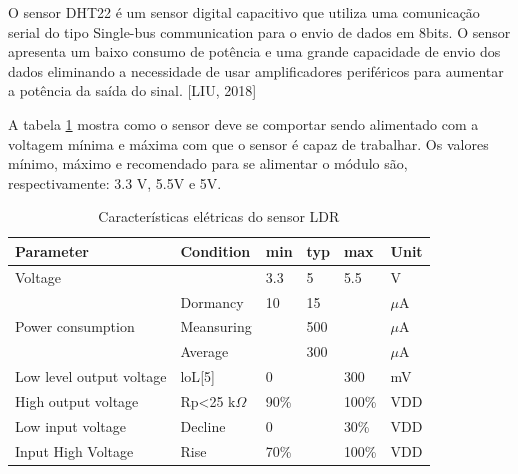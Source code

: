 O sensor DHT22 é um sensor digital capacitivo que utiliza uma comunicação serial do tipo Single-bus communication para o envio de dados em 8bits. O sensor apresenta um baixo consumo de potência e uma grande capacidade de envio dos dados eliminando a necessidade de usar amplificadores periféricos para aumentar a potência da saída do sinal. [LIU, 2018]

A tabela \ref{caracteristicas_eletricas} mostra como o sensor deve se comportar sendo alimentado com a voltagem mínima e máxima com que o sensor é capaz de trabalhar. Os valores mínimo, máximo e recomendado para se alimentar o módulo são, respectivamente: 3.3 V, 5.5V e 5V.

\begin{table}[H]
	\centering
	\caption{Características elétricas do sensor LDR}
	\label{caracteristicas_eletricas}
	\begin{tabular}{|l|l|l|l|l|l|}
		\hline
		\textbf{Parameter}                 & \textbf{Condition}                                           & \textbf{min} & \textbf{typ} & \textbf{max} & \textbf{Unit} \\ \hline
		Voltage                            &                                                              & 3.3          & 5            & 5.5          & V             \\ \hline
		\multirow{3}{*}{Power consumption} & Dormancy                                                     & 10           & 15           &              & $\mu$A           \\ \cline{2-6} 
		& Meansuring                                                   &              & 500          &              & $\mu$A           \\ \cline{2-6} 
		& Average                                                      &              & 300          &              & $\mu$A           \\ \hline
		Low level output voltage           & loL{[}5{]}                                                   & 0            &              & 300          & mV            \\ \hline
		High output voltage                & Rp\textless{}25 k$\Omega$                                       & 90\%         &              & 100\%        & VDD           \\ \hline
		Low input voltage                  & Decline                                                      & 0            &              & 30\%         & VDD           \\ \hline
		Input High Voltage                 & Rise                                                         & 70\%         &              & 100\%        & VDD           \\ \hline

\end{tabular}
\end{table}
